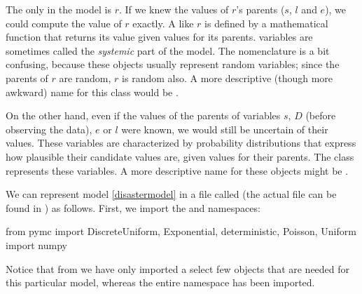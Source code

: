 \documentclass[]{jss}
\begin{document}
The only  in the model is $r$. If we knew the values of
$r$'s parents ($s$, $l$ and $e$), we could compute the value of $r$ exactly. A
 like $r$ is defined by a mathematical function that returns
its value given values for its parents.  variables are
sometimes called the \emph{systemic} part of the model. The nomenclature is a
bit confusing, because these objects usually represent random variables; since
the parents of $r$ are random, $r$ is random also. A more descriptive (though
more awkward) name for this class would be .

On the other hand, even if the values of the parents of variables $s$, $D$ (before observing the data), $e$ or $l$ were known, we would still be uncertain of their values. These variables are characterized by probability distributions that express how plausible their candidate values are, given values for their parents. The  class represents these variables. A more descriptive name for these objects might be .

We can represent model \ref{disastermodel} in a file called
 (the actual file can be found in
) as follows. First, we import the  and 
namespaces:
\begin{CodeInput}
from pymc import DiscreteUniform, Exponential, deterministic, Poisson, Uniform
import numpy
\end{CodeInput}
Notice that from  we have only imported a select few objects that are needed for this particular model, whereas the entire  namespace has been imported.
\end{document}
